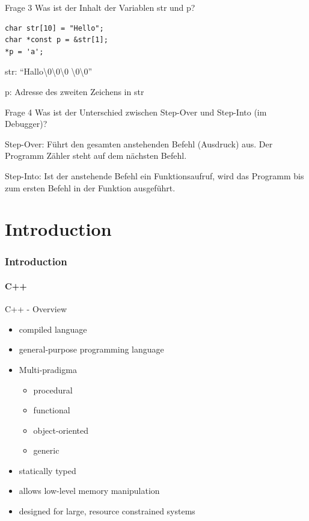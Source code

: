 \documentclass{beamer}
\begin{document}
\begin{frame}[fragile]{Frage 3}
Was ist der Inhalt der Variablen str und p?
\begin{lstlisting}
char str[10] = "Hello";
char *const p = &str[1];
*p = 'a';
\end{lstlisting}

str:
\textquotedblleft{}Hallo\textbackslash0\textbackslash0\textbackslash0
                      \textbackslash0\textbackslash0\textquotedblright

p: Adresse des zweiten Zeichens in str
\end{frame}

\begin{frame}[fragile]{Frage 4}
Was ist der Unterschied zwischen Step-Over und Step-Into (im Debugger)?

Step-Over: Führt den gesamten anstehenden Befehl (Ausdruck) aus. Der Programm
Zähler steht auf dem nächsten Befehl.

Step-Into: Ist der anstehende Befehl ein Funktionsaufruf, wird das Programm 
bis zum ersten Befehl in der Funktion ausgeführt.
\end{frame}


\part{Introduction}

\section{Introduction}

\subsection{C++}
\begin{frame}{C++ - Overview}
\begin{itemize}
  \item compiled language
  \item general-purpose programming language
  \item Multi-pradigma
  \begin{itemize}
    \item procedural
    \item functional
    \item object-oriented
    \item generic
  \end{itemize}
  \item statically typed
  \item allows low-level memory manipulation
  \item designed for large, resource constrained systems 
\end{itemize}
\end{frame}
\end{document}
